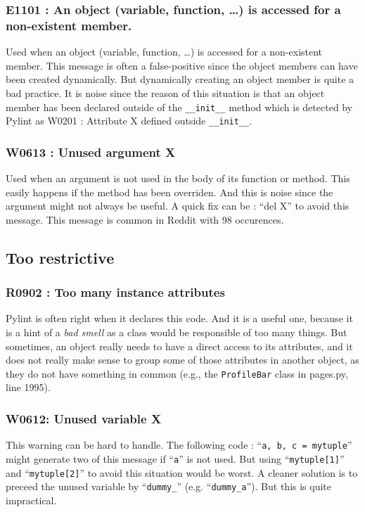 \documentclass[12pt, a4paper]{article}
\newcommand{\tit}[1]{\textit{#1}}
\newcommand{\ttt}[1]{\texttt{#1}}
\newcommand{\pyl}{\textsf{Pylint}}
\begin{document}
\medskip
\subsubsection*{E1101 : An object (variable, function, \dots) is accessed for a non-existent member.}

Used when an object (variable, function, \dots{}) is accessed for a non-existent member.
This message is often a false-positive since the object members can have been created dynamically.
But dynamically creating an object member is quite a bad practice.
It is noise since the reason of this situation is that an object member has been declared outside of the \lstinline|__init__| method which is detected by \pyl{} as W0201 : Attribute X defined outside \lstinline|__init__|.

\medskip
\subsubsection*{W0613 : Unused argument X}
Used when an argument is not used in the body of its function or method.
This easily happens if the method has been overriden.
And this is noise since the argument might not always be useful.
A quick fix can be : ``del X'' to avoid this message.
This message is common in Reddit with 98 occurences.

\newpage
\subsection*{Too restrictive}
\subsubsection*{R0902 : Too many instance attributes}
\pyl{} is often right when it declares this code.
And it is a useful one, because it is a hint of a \tit{bad smell} as a class would be responsible of too many things.
But sometimes, an object really needs to have a direct access to its attributes, and it does not really make sense to group some of those attributes in another object, as they do not have something in common (e.g., the \ttt{ProfileBar} class in pages.py, line 1995).

\medskip
\subsubsection*{W0612: Unused variable X}

This warning can be hard to handle. 
The following code : ``\lstinline|a, b, c = mytuple|'' might generate two of this message if ``\lstinline|a|'' is not used.
But using ``\lstinline|mytuple[1]|'' and ``\lstinline|mytuple[2]|'' to avoid this situation would be worst.
A cleaner solution is to preceed the unused variable by ``\lstinline|dummy_|'' (e.g. ``\lstinline|dummy_a|'').
But this is quite impractical.
\end{document}
